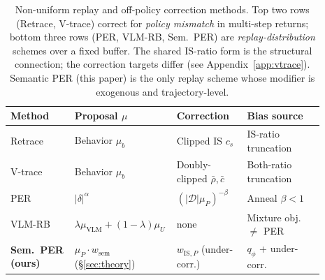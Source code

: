\documentclass{article}
\begin{document}
\begin{table}[t]
  \centering
  \scriptsize
  \setlength{\tabcolsep}{4pt}
  \caption{Non-uniform replay and off-policy correction methods. Top two rows
  (Retrace, V-trace) correct for \emph{policy mismatch} in multi-step returns;
  bottom three rows (PER, VLM-RB, Sem.\ PER) are \emph{replay-distribution}
  schemes over a fixed buffer. The shared IS-ratio form is the structural
  connection; the correction targets differ (see Appendix~\ref{app:vtrace}).
  Semantic PER (this paper) is the only replay scheme whose modifier is
  exogenous and trajectory-level.}
  \label{tab:taxonomy}
  \begin{tabular}{p{0.19\linewidth} p{0.24\linewidth} p{0.22\linewidth} p{0.24\linewidth}}
    \toprule
    Method & Proposal $\mu$ & Correction & Bias source \\
    \midrule
    Retrace \citep{munos2016retrace} & Behavior $\mu_b$ & Clipped IS $c_s$ & IS-ratio truncation \\
    V-trace \citep{espeholt2018impala} & Behavior $\mu_b$ & Doubly-clipped $\bar\rho,\bar c$ & Both-ratio truncation \\
    PER \citep{schaul2016per} & $|\delta|^\alpha$ & $(|\mathcal{D}|\mu_P)^{-\beta}$ & Anneal $\beta<1$ \\
    VLM-RB \citep{sharony2026vlmrb} & $\lambda\mu_{\text{VLM}} + (1\!-\!\lambda)\mu_U$ & none & Mixture obj.\ $\neq$ PER \\
    \textbf{Sem.\ PER (ours)} & $\mu_P\!\cdot\!w_{\text{sem}}$ (\S\ref{sec:theory}) & $w_{\text{IS},P}$ (under-corr.) & $q_\phi$ + under-corr. \\
    \bottomrule
  \end{tabular}
\end{table}
\end{document}

